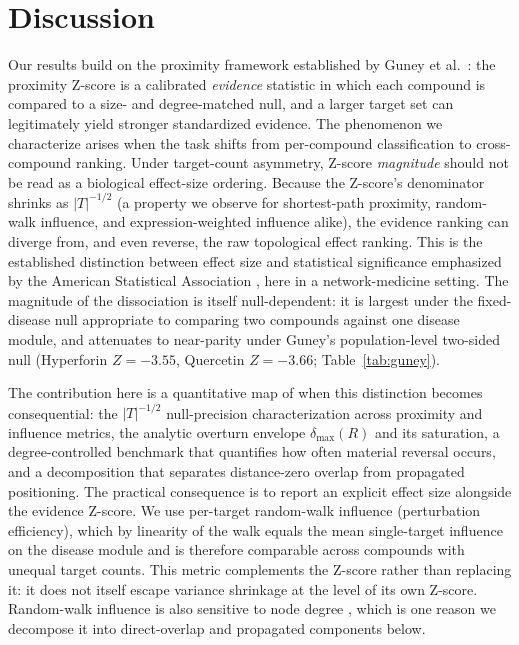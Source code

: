 \section{Discussion}

Our results build on the proximity framework established by Guney et al.\ \citep{Guney2016}: the proximity Z-score is a calibrated \textit{evidence} statistic in which each compound is compared to a size- and degree-matched null, and a larger target set can legitimately yield stronger standardized evidence. The phenomenon we characterize arises when the task shifts from per-compound classification to cross-compound ranking. Under target-count asymmetry, Z-score \textit{magnitude} should not be read as a biological effect-size ordering. Because the Z-score's denominator shrinks as $|T|^{-1/2}$ (a property we observe for shortest-path proximity, random-walk influence, and expression-weighted influence alike), the evidence ranking can diverge from, and even reverse, the raw topological effect ranking. This is the established distinction between effect size and statistical significance emphasized by the American Statistical Association \citep{Wasserstein2016}, here in a network-medicine setting. The magnitude of the dissociation is itself null-dependent: it is largest under the fixed-disease null appropriate to comparing two compounds against one disease module, and attenuates to near-parity under Guney's population-level two-sided null (Hyperforin $Z=-3.55$, Quercetin $Z=-3.66$; Table~\ref{tab:guney}).

The contribution here is a quantitative map of when this distinction becomes consequential: the $|T|^{-1/2}$ null-precision characterization across proximity and influence metrics, the analytic overturn envelope $\delta_{\max}(R)$ and its saturation, a degree-controlled benchmark that quantifies how often material reversal occurs, and a decomposition that separates distance-zero overlap from propagated positioning. The practical consequence is to report an explicit effect size alongside the evidence Z-score. We use per-target random-walk influence (perturbation efficiency), which by linearity of the walk equals the mean single-target influence on the disease module and is therefore comparable across compounds with unequal target counts. This metric complements the Z-score rather than replacing it: it does not itself escape variance shrinkage at the level of its own Z-score. Random-walk influence is also sensitive to node degree \citep{Cowen2017, Erten2011}, which is one reason we decompose it into direct-overlap and propagated components below.

